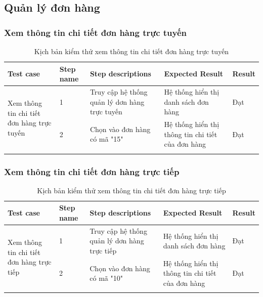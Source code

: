 \subsection{Quản lý đơn hàng}
\subsubsection{ Xem thông tin chi tiết đơn hàng trực tuyến}
{
    \setlength\extrarowheight{6pt}
    \begin{longtable}{| p{2.5cm}| p{1cm}| p{5.5cm}| p{4.5cm} | p{1.5cm} |}
        \hline
        \textbf{Test case}                                                  & \textbf{Step name} & \textbf{Step descriptions}                    & \textbf{Expected Result}                          & \textbf{Result} \\
        \hline
        \multirow[t]{2}{2.5cm}{ Xem thông tin chi tiết đơn hàng trực tuyến} & 1                  & Truy cập hệ thống quản lý dơn hàng trực tuyến & Hệ thống hiển thị danh sách đơn hàng              & Đạt             \\
        \cline{2-5}
                                                                            & 2                  & Chọn vào đơn hàng có mã "15"                  & Hệ thống hiển thị thông tin chi tiết của đơn hàng & Đạt             \\
        \hline
        \caption{Kịch bản kiểm thử xem thông tin chi tiết đơn hàng trực tuyến}
    \end{longtable}
}

\subsubsection{ Xem thông tin chi tiết đơn hàng trực tiếp}
{
    \setlength\extrarowheight{6pt}
    \begin{longtable}{| p{2.5cm}| p{1cm}| p{5.5cm}| p{4.5cm} | p{1.5cm} |}
        \hline
        \textbf{Test case}                                                 & \textbf{Step name} & \textbf{Step descriptions}                   & \textbf{Expected Result}                          & \textbf{Result} \\
        \hline
        \multirow[t]{2}{2.5cm}{ Xem thông tin chi tiết đơn hàng trực tiếp} & 1                  & Truy cập hệ thống quản lý dơn hàng trực tiếp & Hệ thống hiển thị danh sách đơn hàng              & Đạt             \\
        \cline{2-5}
                                                                           & 2                  & Chọn vào đơn hàng có mã "10"                 & Hệ thống hiển thị thông tin chi tiết của đơn hàng & Đạt             \\
        \hline
        \caption{Kịch bản kiểm thử xem thông tin chi tiết đơn hàng trực tiếp}
    \end{longtable}
}